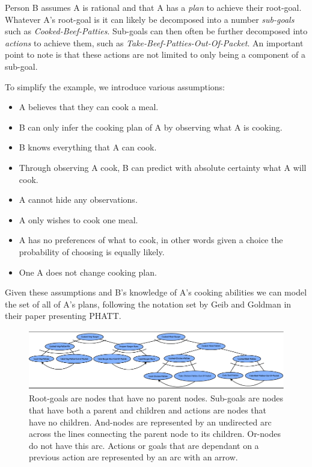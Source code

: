 \documentclass[parskip]{cs4rep}
\begin{document}
Person B assumes A is rational and that A has a \textit{plan} to achieve their root-goal. Whatever A's root-goal is it can likely be decomposed into a number \textit{sub-goals} such as \textit{Cooked-Beef-Patties}. Sub-goals can then often be further decomposed into \textit{actions} to achieve them, such as \textit{Take-Beef-Patties-Out-Of-Packet}. An important point to note is that these actions are not limited to only being a component of a sub-goal.

To simplify the example, we introduce various assumptions:

\begin{itemize}
\item
A believes that they can cook a meal.
\item
B can only infer the cooking plan of A by observing what A is cooking.
\item
B knows everything that A can cook.
\item
Through observing A cook, B can predict with absolute certainty what A will cook.
\item
A cannot hide any observations.
\item
A only wishes to cook one meal.
\item
A has no preferences of what to cook, in other words given a choice the probability of choosing is equally likely.
\item
One A does not change cooking plan.
\end{itemize}

Given these assumptions and B's knowledge of A's cooking abilities we can model the set of all of A's plans, following the notation set by Geib and Goldman in their paper presenting PHATT.

\begin{figure}[h]
\centerline{
	\includegraphics{images/example-plan-library}
}
\caption{Root-goals are nodes that have no parent nodes. Sub-goals are nodes that have both a parent and children and actions are nodes that have no children. And-nodes are represented by an undirected arc across the lines connecting the parent node to its children. Or-nodes do not have this arc. Actions or goals that are dependant on a previous action are represented by an arc with an arrow.}
\label{fig:example-plan-library}
\end{figure}
\end{document}
